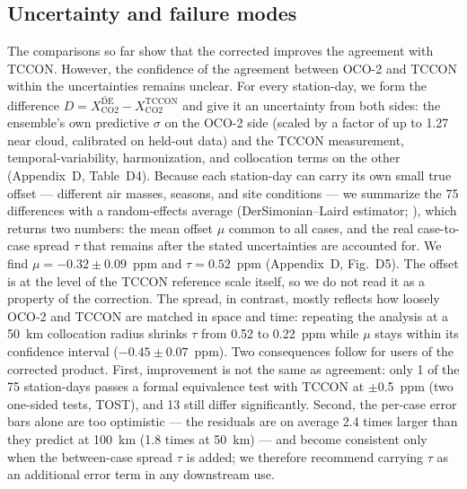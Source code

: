 \subsection{Uncertainty and failure modes}
\label{sec:result-unc}



The comparisons so far show that the corrected \xcode improves the agreement with TCCON. However, the confidence of the agreement between OCO-2 and TCCON within the uncertainties remains unclear. For every station-day, we form the difference $D = \overline{X^{\mathrm{DE}}_{\mathrm{CO2}}} - X^{\mathrm{TCCON}}_{\mathrm{CO2}}$ and give it an uncertainty from both sides: the ensemble's own predictive $\sigma$ on the OCO-2 side (scaled by a factor of up to 1.27 near cloud, calibrated on held-out data) and the TCCON measurement, temporal-variability, harmonization, and collocation terms on the other (Appendix~D, Table~D4). Because each station-day can carry its own small true offset — different air masses, seasons, and site conditions — we summarize the 75 differences with a random-effects average (DerSimonian--Laird estimator; \citealp{dersimonian1986meta}), which returns two numbers: the mean offset $\mu$ common to all cases, and the real case-to-case spread $\tau$ that remains after the stated uncertainties are accounted for. We find $\mu = -0.32 \pm 0.09$~ppm and $\tau = 0.52$~ppm (Appendix~D, Fig.~D5). The offset is at the level of the TCCON reference scale
itself, so we do not read it as a property of the correction. The spread, in contrast, mostly reflects how loosely OCO-2 and TCCON are matched in space and time: repeating the analysis at a 50~km
collocation radius shrinks $\tau$ from 0.52 to 0.22~ppm while $\mu$ stays within its confidence interval ($-0.45 \pm 0.07$~ppm). Two consequences follow for users of the corrected product. First,
improvement is not the same as agreement: only 1 of the 75 station-days passes a formal equivalence test with TCCON at $\pm$0.5~ppm (two one-sided tests, TOST), and 13 still differ significantly. Second, the per-case error bars alone are too optimistic — the residuals are on average 2.4 times larger than they predict at 100~km (1.8 times at 50~km) — and become consistent only when the between-case spread $\tau$ is added; we therefore recommend carrying $\tau$ as an additional error term in any downstream use.

